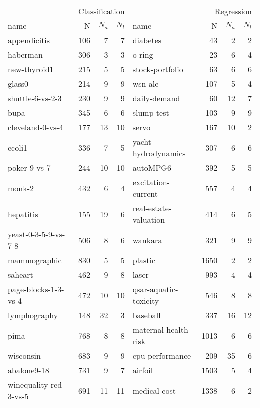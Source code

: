 \begin{tabular}{lrrrlrrr}
\toprule
\multicolumn{4}{r}{Classification} & \multicolumn{4}{r}{Regression} \\
name & N & $N_a$ & $N_l$ & name & N & $N_a$ & $N_l$ \\
\midrule
appendicitis \cite{keel} & 106 & 7 & 7 & diabetes \cite{keel} & 43 & 2 & 2 \\
haberman \cite{keel} & 306 & 3 & 3 & o-ring \cite{uci} & 23 & 6 & 4 \\
new-thyroid1 \cite{keel} & 215 & 5 & 5 & stock-portfolio \cite{uci} & 63 & 6 & 6 \\
glass0 \cite{keel} & 214 & 9 & 9 & wsn-ale \cite{uci} & 107 & 5 & 4 \\
shuttle-6-vs-2-3 \cite{keel} & 230 & 9 & 9 & daily-demand \cite{uci} & 60 & 12 & 7 \\
bupa \cite{keel} & 345 & 6 & 6 & slump-test \cite{krnn} & 103 & 9 & 9 \\
cleveland-0-vs-4 \cite{keel} & 177 & 13 & 10 & servo \cite{uci} & 167 & 10 & 2 \\
ecoli1 \cite{keel} & 336 & 7 & 5 & yacht-hydrodynamics \cite{krnn} & 307 & 6 & 6 \\
poker-9-vs-7 \cite{keel} & 244 & 10 & 10 & autoMPG6 \cite{keel} & 392 & 5 & 5 \\
monk-2 \cite{keel} & 432 & 6 & 4 & excitation-current \cite{uci} & 557 & 4 & 4 \\
hepatitis \cite{krnn} & 155 & 19 & 6 & real-estate-valuation \cite{uci} & 414 & 6 & 5 \\
yeast-0-3-5-9-vs-7-8 \cite{keel} & 506 & 8 & 6 & wankara \cite{keel} & 321 & 9 & 9 \\
mammographic \cite{keel} & 830 & 5 & 5 & plastic \cite{keel} & 1650 & 2 & 2 \\
saheart \cite{keel} & 462 & 9 & 8 & laser \cite{keel} & 993 & 4 & 4 \\
page-blocks-1-3-vs-4 \cite{keel} & 472 & 10 & 10 & qsar-aquatic-toxicity \cite{uci} & 546 & 8 & 8 \\
lymphography \cite{keel} & 148 & 32 & 3 & baseball \cite{keel} & 337 & 16 & 12 \\
pima \cite{keel} & 768 & 8 & 8 & maternal-health-risk \cite{uci} & 1013 & 6 & 6 \\
wisconsin \cite{keel} & 683 & 9 & 9 & cpu-performance \cite{krnn} & 209 & 35 & 6 \\
abalone9-18 \cite{keel} & 731 & 9 & 7 & airfoil \cite{krnn} & 1503 & 5 & 4 \\
winequality-red-3-vs-5 \cite{keel} & 691 & 11 & 11 & medical-cost \cite{mlwithr} & 1338 & 6 & 2 \\
\bottomrule
\end{tabular}

